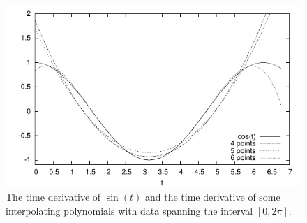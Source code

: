 \begin{figure}[ht]
\centering
\includegraphics{interpolation_figs/cos.pdf}
\caption{The time derivative of $\sin(t)$ and the time derivative of some interpolating polynomials with data spanning the interval $[0,2\pi]$.}
\label{fig:cos_inter}
\end{figure}
